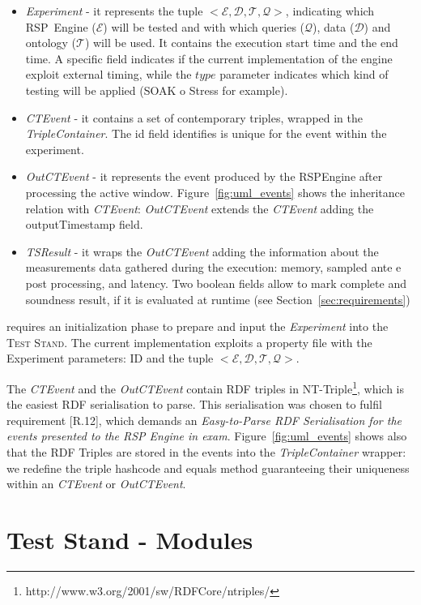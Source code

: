 \begin{itemize}
\item \textit{Experiment} - it represents the tuple $<\mathcal{E}, \mathcal{D},\mathcal{T},\mathcal{Q}>$, indicating which RSP~Engine ($\mathcal{E}$) will be tested and with which queries ($\mathcal{Q}$), data ($\mathcal{D}$) and ontology  ($\mathcal{T}$) will be used. It contains the execution start time and the end time. A specific field indicates if the current implementation of the engine exploit external timing, while the $type$ parameter indicates which kind of testing will be applied (SOAK o Stress for example).
\item \textit{CTEvent} - it contains a set of contemporary triples, wrapped in the \textit{TripleContainer}. The id field identifies is unique for the event within the experiment.
\item \textit{OutCTEvent} - it represents the event produced by the RSPEngine after processing the active window. Figure~\ref{fig:uml_events} shows the inheritance relation with \textit{CTEvent}:  \textit{OutCTEvent} extends the \textit{CTEvent} adding the outputTimestamp field.
\item \textit{TSResult} - it wraps the \textit{OutCTEvent} adding the information about the measurements data gathered during the execution: memory, sampled ante e post processing, and latency. Two boolean fields allow to mark complete and soundness result, if it is evaluated at runtime (see Section~\ref{sec:requirements})
\end{itemize}

\name requires an initialization phase to prepare and input the \textit{Experiment} into the \textsc{Test Stand}. The current implementation exploits a property file with the Experiment parameters: ID and the tuple $<\mathcal{E}, \mathcal{D},\mathcal{T},\mathcal{Q}>$. 

The \textit{CTEvent} and the \textit{OutCTEvent} contain RDF triples in NT-Triple\footnote{http://www.w3.org/2001/sw/RDFCore/ntriples/}, which is the easiest RDF serialisation to parse. This serialisation was chosen to fulfil requirement [R.12], which demands an \textit{Easy-to-Parse RDF Serialisation for the events presented to the RSP Engine in exam}. Figure~\ref{fig:uml_events} shows also that the RDF Triples are stored in the events into the \textit{TripleContainer} wrapper: we redefine the triple hashcode and equals method guaranteeing their uniqueness within an \textit{CTEvent} or \textit{OutCTEvent}.

\section{Test Stand - Modules}\label{sec:modules-impl}


